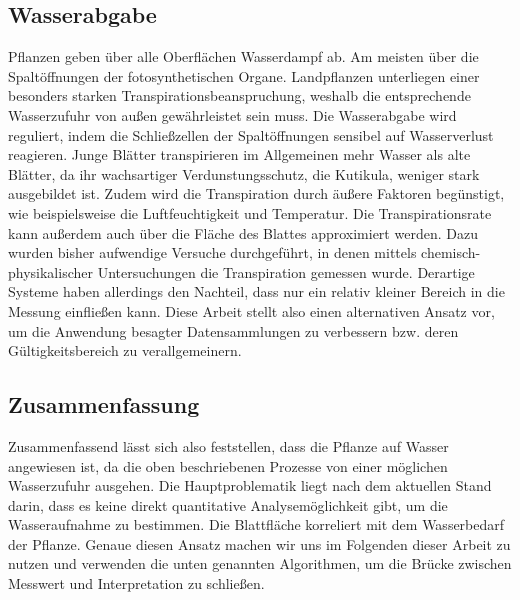 \subsection{Wasserabgabe}
Pflanzen geben über alle Oberflächen Wasserdampf ab. Am meisten über die Spaltöffnungen der fotosynthetischen Organe. Landpflanzen unterliegen einer besonders starken Transpirationsbeanspruchung, weshalb die entsprechende Wasserzufuhr von außen gewährleistet sein muss. Die Wasserabgabe wird reguliert, indem die Schließzellen der Spaltöffnungen sensibel auf Wasserverlust reagieren. Junge Blätter transpirieren im Allgemeinen mehr Wasser als alte Blätter, da ihr wachsartiger Verdunstungsschutz, die Kutikula, weniger stark ausgebildet ist. Zudem wird die Transpiration durch äußere Faktoren begünstigt, wie beispielsweise die Luftfeuchtigkeit und Temperatur. Die Transpirationsrate kann außerdem auch über die Fläche des Blattes approximiert werden. Dazu wurden bisher aufwendige Versuche durchgeführt, in denen mittels chemisch-physikalischer Untersuchungen die Transpiration gemessen wurde. Derartige Systeme haben allerdings den Nachteil, dass nur ein relativ kleiner Bereich in die Messung einfließen kann. Diese Arbeit stellt also einen alternativen Ansatz vor, um die Anwendung besagter Datensammlungen zu verbessern bzw. deren Gültigkeitsbereich zu verallgemeinern.
\subsection{Zusammenfassung}
Zusammenfassend lässt sich also feststellen, dass die Pflanze auf Wasser angewiesen ist, da die oben beschriebenen Prozesse von einer möglichen Wasserzufuhr ausgehen. Die Hauptproblematik liegt nach dem aktuellen Stand darin, dass es keine direkt quantitative Analysemöglichkeit gibt, um die Wasseraufnahme zu bestimmen. \cite{exp} Die Blattfläche korreliert mit dem Wasserbedarf der Pflanze. Genaue diesen Ansatz machen wir uns im Folgenden dieser Arbeit zu nutzen und verwenden die unten genannten Algorithmen, um die Brücke zwischen Messwert und Interpretation zu schließen.
\newpage

